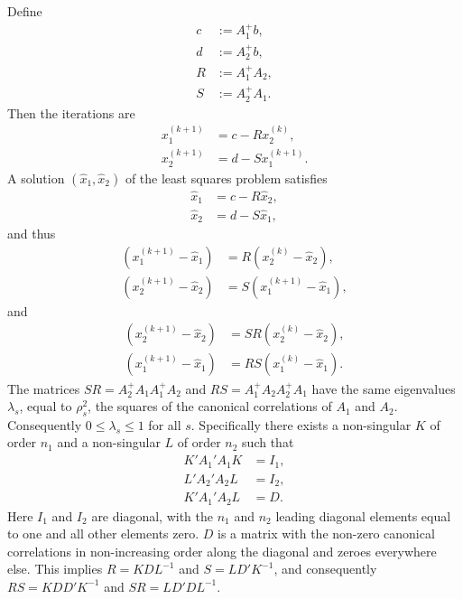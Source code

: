 \documentclass[
  12pt,
]{book}
\begin{document}
Define
\begin{align*}
c&:=A_1^+b,\\
d&:=A_2^+b,\\
R&:=A_1^+A_2^{\ },\\
S&:=A_2^+A_1^{\ }.
\end{align*}
Then the iterations are
\begin{align*}
x_1^{(k+1)}&=c-Rx_2^{(k)},\\
x_2^{(k+1)}&=d-Sx_1^{(k+1)}.
\end{align*}
A solution \((\hat x_1,\hat x_2)\) of the least squares problem satisfies
\begin{align*}
\hat x_1&=c-R\hat x_2,\\
\hat x_2&=d-S\hat x_1,
\end{align*}
and thus
\begin{align*}
(x_1^{(k+1)}-\hat x_1)&=R(x_2^{(k)}-\hat x_2),\\
(x_2^{(k+1)}-\hat x_2)&=S(x_1^{(k+1)}-\hat x_1),
\end{align*}
and
\begin{align*}
(x_2^{(k+1)}-\hat x_2)&=SR(x_2^{(k)}-\hat x_2),\\
(x_1^{(k+1)}-\hat x_1)&=RS(x_1^{(k)}-\hat x_1).
\end{align*}
The matrices \(SR=A_2^+A_1^{\ }A_1^+A_2^{\ }\) and \(RS=A_1^+A_2^{\ }A_2^+A_1^{\ }\) have the same eigenvalues \(\lambda_s\), equal to \(\rho_s^2\), the squares of the canonical correlations of \(A_1\)
and \(A_2\). Consequently \(0\leq\lambda_s\leq 1\) for all \(s\). Specifically there exists
a non-singular \(K\) of order \(n_1\) and a non-singular \(L\) of order \(n_2\) such that
\begin{align*}
K'A_1'A_1^{\ }K&=I_1,\\
L'A_2'A_2^{\ }L&=I_2,\\
K'A_1'A_2^{\ }L&=D.
\end{align*}
Here \(I_1\) and \(I_2\) are diagonal, with the \(n_1\) and \(n_2\) leading diagonal elements
equal to one and all other elements zero. \(D\) is a matrix with the non-zero canonical correlations in non-increasing order along the diagonal and zeroes everywhere else. This implies \(R=KDL^{-1}\) and \(S=LD'K^{-1}\), and consequently \(RS=KDD'K^{-1}\)
and \(SR=LD'DL^{-1}\).
\end{document}
